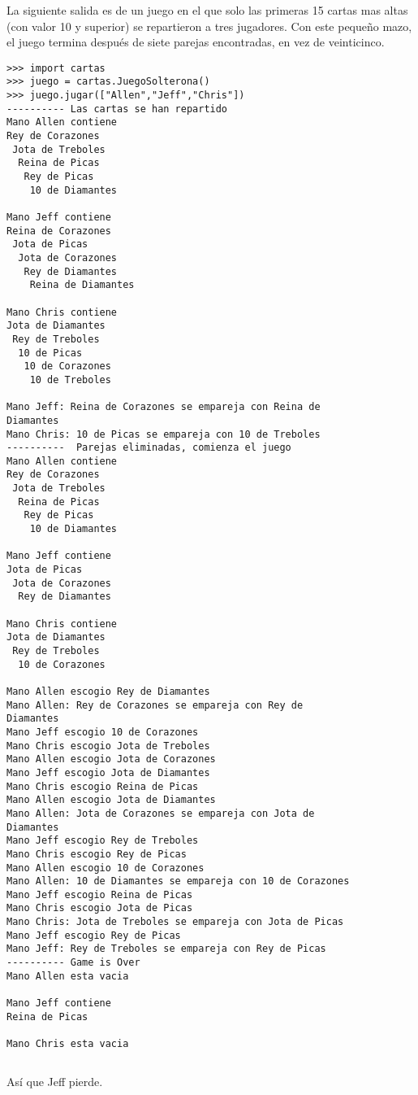 La siguiente salida es de un juego en el que solo las primeras 15
cartas mas altas (con valor 10 y superior) se repartieron a tres jugadores.
Con este pequeño mazo, el juego termina después de siete parejas encontradas,
en vez de veinticinco.
\begin{verbatim}
>>> import cartas
>>> juego = cartas.JuegoSolterona()
>>> juego.jugar(["Allen","Jeff","Chris"])
---------- Las cartas se han repartido
Mano Allen contiene
Rey de Corazones
 Jota de Treboles
  Reina de Picas
   Rey de Picas
    10 de Diamantes

Mano Jeff contiene
Reina de Corazones
 Jota de Picas
  Jota de Corazones
   Rey de Diamantes
    Reina de Diamantes

Mano Chris contiene
Jota de Diamantes
 Rey de Treboles
  10 de Picas
   10 de Corazones
    10 de Treboles

Mano Jeff: Reina de Corazones se empareja con Reina de 
Diamantes
Mano Chris: 10 de Picas se empareja con 10 de Treboles
----------  Parejas eliminadas, comienza el juego
Mano Allen contiene
Rey de Corazones
 Jota de Treboles
  Reina de Picas
   Rey de Picas
    10 de Diamantes

Mano Jeff contiene
Jota de Picas
 Jota de Corazones
  Rey de Diamantes

Mano Chris contiene
Jota de Diamantes
 Rey de Treboles
  10 de Corazones

Mano Allen escogio Rey de Diamantes
Mano Allen: Rey de Corazones se empareja con Rey de 
Diamantes
Mano Jeff escogio 10 de Corazones
Mano Chris escogio Jota de Treboles
Mano Allen escogio Jota de Corazones
Mano Jeff escogio Jota de Diamantes
Mano Chris escogio Reina de Picas
Mano Allen escogio Jota de Diamantes
Mano Allen: Jota de Corazones se empareja con Jota de 
Diamantes
Mano Jeff escogio Rey de Treboles
Mano Chris escogio Rey de Picas
Mano Allen escogio 10 de Corazones
Mano Allen: 10 de Diamantes se empareja con 10 de Corazones
Mano Jeff escogio Reina de Picas
Mano Chris escogio Jota de Picas
Mano Chris: Jota de Treboles se empareja con Jota de Picas
Mano Jeff escogio Rey de Picas
Mano Jeff: Rey de Treboles se empareja con Rey de Picas
---------- Game is Over
Mano Allen esta vacia

Mano Jeff contiene
Reina de Picas

Mano Chris esta vacia
\end{verbatim}
\begin{verbatim}

\end{verbatim}
Así que Jeff pierde.

